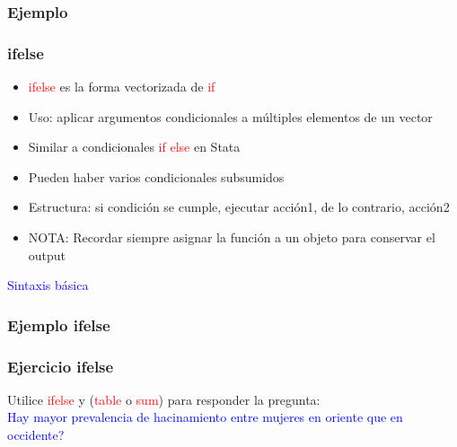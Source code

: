 \documentclass{beamer}
\begin{document}
\begin{frame}
 \frametitle{Ejemplo}
\lst
\end{frame}


\begin{frame}
 \frametitle{ifelse}
 \begin{itemize}
  \item \textcolor{red}{ifelse} es la forma vectorizada de \textcolor{red}{if}
  \item  Uso: aplicar argumentos condicionales a m\'ultiples elementos de un vector
  \item Similar a condicionales \textcolor{red}{if} \textcolor{red}{else} en Stata
  \item Pueden haber varios condicionales subsumidos
  \item Estructura: si condici\'on se cumple, ejecutar acci\'on1, de lo contrario, acci\'on2
  \item NOTA: Recordar siempre asignar la funci\'on a un objeto para conservar el output
 \end{itemize}
\textcolor{blue}{Sintaxis b\'asica}
\lst
\end{frame}



\begin{frame}
 \frametitle{Ejemplo ifelse}
\lst
\end{frame}

\begin{frame}
 \frametitle{Ejercicio ifelse}
Utilice \textcolor{red}{ifelse} y (\textcolor{red}{table} o \textcolor{red}{sum}) para responder la pregunta:\\
\textcolor{blue}{Hay mayor prevalencia de hacinamiento entre mujeres en oriente que en occidente?}
\end{frame}
\end{document}
